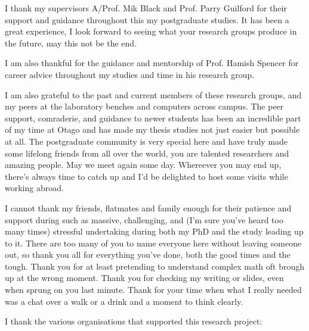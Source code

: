 I thank my supervisors A/Prof. Mik Black and Prof. Parry Guilford for their support and guidance throughout this my postgraduate studies. It has been a great experience, I look forward to seeing what your research groups produce in the future, may this not be the end.

I am also thankful for the guidance and mentorship of Prof. Hamish Spencer for career advice throughout my studies and time in his research group.

I am also grateful to the past and current members of these research groups, and my peers at the laboratory benches and computers across campus. The peer support, comraderie, and guidance to newer students has been an incredible part of my time at Otago and has made my thesis studies not just easier but possible at all. The postgraduate community is very special here and have truly made some lifelong friends from all over the world, you are talented researchers and amazing people. May we meet again some day. Whereever you may end up, there's always time to catch up and I'd be delighted to host some visits while working abroad.

I cannot thank my friends, flatmates and family enough for their patience and support during such as massive, challenging, and (I'm sure you've heard too many times) stressful undertaking during both my PhD and the study leading up to it. There are too many of you to name everyone here without leaving someone out, so thank you all for everything you've done, both the good times and the tough. Thank you for at least pretending to understand complex math oft brough up at the wrong moment. Thank you for checking my writing or slides, even when sprung on you last minute. Thank for your time when what I really needed was a chat over a walk or a drink and a moment to think clearly.

I thank the various organisations that supported this research project:

